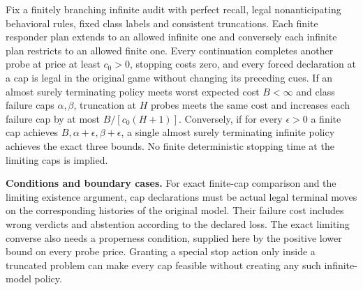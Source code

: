 \begin{theorem}\label{ext:m044}

Fix a finitely branching infinite audit with perfect recall, legal nonanticipating behavioral rules, fixed class labels and consistent truncations. Each finite responder plan extends to an allowed infinite one and conversely each infinite plan restricts to an allowed finite one. Every continuation completes another probe at price at least \(c_0>0\), stopping costs zero, and every forced declaration at a cap is legal in the original game without changing its preceding cues. If an almost surely terminating policy meets worst expected cost \(B<\infty\) and class failure caps \(\alpha,\beta\), truncation at \(H\) probes meets the same cost and increases each failure cap by at most \(B/[c_0(H+1)]\). Conversely, if for every \(\epsilon>0\) a finite cap achieves \(B,\alpha+\epsilon,\beta+\epsilon\), a single almost surely terminating infinite policy achieves the exact three bounds. No finite deterministic stopping time at the limiting caps is implied.

\textbf{Conditions and boundary cases.} For exact finite-cap comparison and the limiting existence argument, cap declarations must be actual legal terminal moves on the corresponding histories of the original model. Their failure cost includes wrong verdicts and abstention according to the declared loss. The exact limiting converse also needs a properness condition, supplied here by the positive lower bound on every probe price. Granting a special stop action only inside a truncated problem can make every cap feasible without creating any such infinite-model policy.

\end{theorem}

